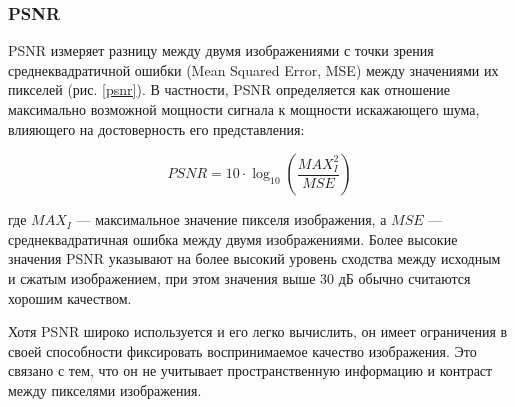 \subsubsection{PSNR}\label{sect-1-3-1}

PSNR измеряет разницу между двумя изображениями с точки зрения среднеквадратичной ошибки (Mean Squared Error, MSE) между значениями их пикселей (рис. \ref{psnr}). В частности, PSNR определяется как отношение максимально возможной мощности сигнала к мощности искажающего шума, влияющего на достоверность его представления:

\begin{equation}
    \label{eq:1-3-1}
    PSNR = 10 \cdot \log_{10} \left( \frac{MAX_I^2}{MSE} \right)
\end{equation}


где $MAX_I$ — максимальное значение пикселя изображения, а $MSE$ — среднеквадратичная ошибка между двумя изображениями. Более высокие значения PSNR указывают на более высокий уровень сходства между исходным и сжатым изображением, при этом значения выше 30 дБ обычно считаются хорошим качеством.


Хотя PSNR широко используется и его легко вычислить, он имеет ограничения в своей способности фиксировать воспринимаемое качество изображения. Это связано с тем, что он не учитывает пространственную информацию и контраст между пикселями изображения. 

